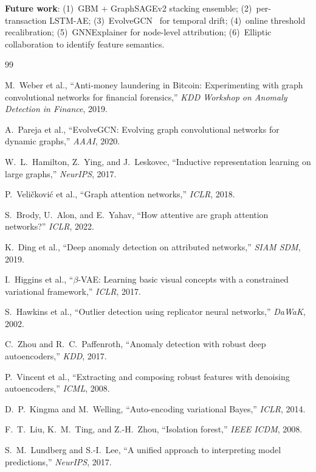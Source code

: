 \documentclass[conference]{IEEEtran}
\begin{document}
\textbf{Future work}: (1)~GBM + GraphSAGEv2 stacking ensemble;
(2)~per-transaction LSTM-AE; (3)~EvolveGCN~\cite{pareja2020evolve} for
temporal drift; (4)~online threshold recalibration;
(5)~GNNExplainer for node-level attribution;
(6)~Elliptic collaboration to identify feature semantics.

\begin{thebibliography}{99}

M.~Weber et al., ``Anti-money laundering in Bitcoin: Experimenting with graph
convolutional networks for financial forensics,'' \textit{KDD Workshop on
Anomaly Detection in Finance}, 2019.

A.~Pareja et al., ``EvolveGCN: Evolving graph convolutional networks for
dynamic graphs,'' \textit{AAAI}, 2020.

W.~L.~Hamilton, Z.~Ying, and J.~Leskovec, ``Inductive representation learning
on large graphs,'' \textit{NeurIPS}, 2017.

P.~Veli\v{c}kovi\'{c} et al., ``Graph attention networks,'' \textit{ICLR},
2018.

S.~Brody, U.~Alon, and E.~Yahav, ``How attentive are graph attention
networks?'' \textit{ICLR}, 2022.

K.~Ding et al., ``Deep anomaly detection on attributed networks,''
\textit{SIAM SDM}, 2019.

I.~Higgins et al., ``$\beta$-VAE: Learning basic visual concepts with a
constrained variational framework,'' \textit{ICLR}, 2017.

S.~Hawkins et al., ``Outlier detection using replicator neural networks,''
\textit{DaWaK}, 2002.

C.~Zhou and R.~C.~Paffenroth, ``Anomaly detection with robust deep
autoencoders,'' \textit{KDD}, 2017.

P.~Vincent et al., ``Extracting and composing robust features with denoising
autoencoders,'' \textit{ICML}, 2008.

D.~P.~Kingma and M.~Welling, ``Auto-encoding variational Bayes,''
\textit{ICLR}, 2014.

F.~T.~Liu, K.~M.~Ting, and Z.-H.~Zhou, ``Isolation forest,''
\textit{IEEE ICDM}, 2008.

S.~M.~Lundberg and S.-I.~Lee, ``A unified approach to interpreting model
predictions,'' \textit{NeurIPS}, 2017.


\end{thebibliography}
\end{document}
